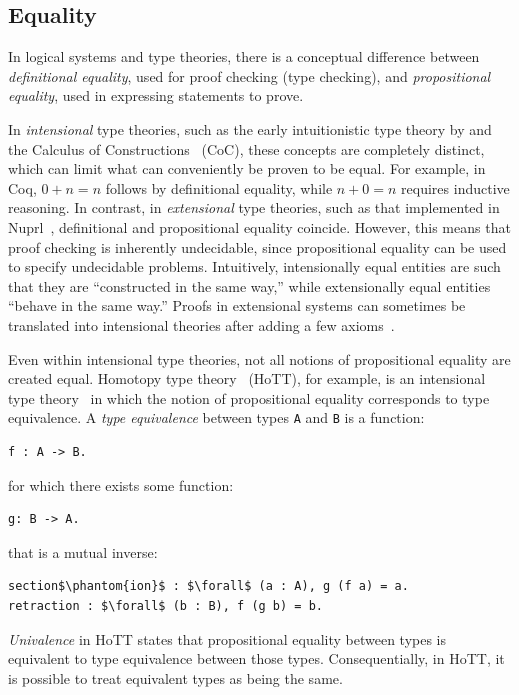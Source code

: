
\subsection{Equality}
\label{sec:equality}

In logical systems and type theories, there is a conceptual difference between \emph{definitional equality}, used for proof checking (type checking), and \emph{propositional equality}, used in expressing statements to prove. 

In \emph{intensional} type theories, such as the early intuitionistic type theory by \cite{MartinLof1982a} and the Calculus of Constructions~\citep{Coquand1988} (CoC), these concepts are completely distinct, which can limit what can conveniently be proven to be equal. For example, in Coq, $0+n=n$ follows by definitional equality, while $n+0=n$ requires inductive reasoning. 
In contrast, in \emph{extensional} type theories, such as that implemented in Nuprl~\citep{Constable1986}, definitional and propositional equality coincide. However, this means that proof checking is inherently undecidable, since propositional equality can be used to specify undecidable problems. Intuitively, intensionally equal entities are such that they are ``constructed in the same way,'' while extensionally equal entities ``behave in the same way.'' Proofs in extensional systems can sometimes be translated into intensional theories after adding a few axioms~\citep{Oury2005}.

Even within intensional type theories, not all notions of propositional equality are created equal.
Homotopy type theory~\citep{univalent2013homotopy} (HoTT), for example, is an intensional type theory~\citep{nlab:intensional_type_theory} in which 
the notion of propositional equality corresponds to type equivalence.
A \textit{type equivalence} between types \lstinline{A} and \lstinline{B} is a function:
\begin{lstlisting}
f : A -> B.
\end{lstlisting}
for which there exists some function:
\begin{lstlisting}
g: B -> A.
\end{lstlisting}
that is a mutual inverse:
\begin{lstlisting}
section$\phantom{ion}$ : $\forall$ (a : A), g (f a) = a.
retraction : $\forall$ (b : B), f (g b) = b.
\end{lstlisting}
\textit{Univalence} in HoTT states that propositional
equality between types is equivalent to type equivalence between those types.
Consequentially, in HoTT, it is possible to treat equivalent types as being the same.


